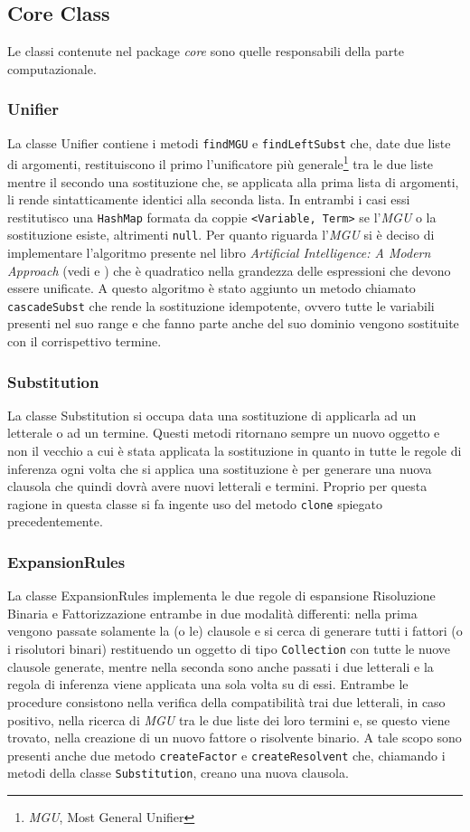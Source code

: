 \documentclass[a4paper,11pt]{article}
\begin{document}
\subsection{Core Class}
Le classi contenute nel package \emph{core} sono quelle responsabili della parte computazionale.
\subsubsection{Unifier}
La classe Unifier contiene i metodi \texttt{findMGU} e \texttt{findLeftSubst} che, date due liste di argomenti, restituiscono il primo l'unificatore più generale\footnote{\emph{MGU}, Most General Unifier} tra le due liste mentre il secondo una sostituzione che, se applicata alla prima lista di argomenti, li rende sintatticamente identici alla seconda lista. In entrambi i casi essi restitutisco una \texttt{HashMap} formata da coppie \texttt{<Variable, Term>} se l'\emph{MGU} o la sostituzione esiste, altrimenti \texttt{null}. Per quanto riguarda l'\emph{MGU} si è deciso di implementare l'algoritmo presente nel libro \emph{Artificial Intelligence: A Modern Approach} (vedi \cite{AIMAbook} e \cite{AIMAalgo}) che è quadratico nella grandezza delle espressioni che devono essere unificate. A questo algoritmo è stato aggiunto un metodo chiamato \texttt{cascadeSubst} che rende la sostituzione idempotente, ovvero tutte le variabili presenti nel suo range e che fanno parte anche del suo dominio vengono sostituite con il corrispettivo termine.
\subsubsection{Substitution}
La classe Substitution si occupa data una sostituzione di applicarla ad un letterale o ad un termine. Questi metodi ritornano sempre un nuovo oggetto e non il vecchio a cui è stata applicata la sostituzione in quanto in tutte le regole di inferenza ogni volta che si applica una sostituzione è per generare una nuova clausola che quindi dovrà avere nuovi letterali e termini. Proprio per questa ragione in questa classe si fa ingente uso del metodo \texttt{clone} spiegato precedentemente.
\subsubsection{ExpansionRules}
La classe ExpansionRules implementa le due regole di espansione Risoluzione Binaria e Fattorizzazione entrambe in due modalità differenti: nella prima vengono passate solamente la (o le) clausole e si cerca di generare tutti i fattori (o i risolutori binari) restituendo un oggetto di tipo \texttt{Collection} con tutte le nuove clausole generate, mentre nella seconda sono anche passati i due letterali e la regola di inferenza viene applicata una sola volta su di essi. Entrambe le procedure consistono nella verifica della compatibilità trai due letterali, in caso positivo, nella ricerca di \emph{MGU} tra le due liste dei loro termini e, se questo viene trovato, nella creazione di un nuovo fattore o risolvente binario. A tale scopo sono presenti anche due metodo \texttt{createFactor} e \texttt{createResolvent} che, chiamando i metodi della classe \texttt{Substitution}, creano una nuova clausola.
\end{document}
